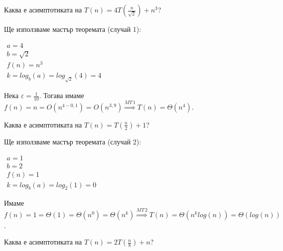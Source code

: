 \begin{problem}
	Каква е асимптотиката на $T(n)=4T(\frac n{\sqrt2})+n^3$?
\end{problem}

\begin{solution}
	Ще използваме $\hyperref[th:master-theorem]{\text{мастър теоремата}}$ (случай 1):
	\begin{center}
		$\begin{array}{|l}
			a=4\\
			b=\sqrt2\\
			f(n)=n^3\\
			k=log_b(a)=log_{\sqrt2}(4)=4
		\end{array}$
	\end{center}
	Нека $\varepsilon=\frac1{10}$. Тогава имаме $f(n)=n=O(n^{4-0,1})=O(n^{3,9})\overset{MT\,1}{\Longrightarrow}T(n)=\Theta(n^4)$.
\end{solution}\leavevmode\newline

\begin{problem}
	Каква е асимптотиката на $T(n)=T(\frac n2)+1$?
\end{problem}

\begin{solution}
	Ще използваме $\hyperref[th:master-theorem]{\text{мастър теоремата}}$ (случай 2):
	\begin{center}
		$\begin{array}{|l}
			a=1\\
			b=2\\
			f(n)=1\\
			k=log_b(a)=log_2(1)=0
		\end{array}$
	\end{center}
	Имаме $f(n)=1=\Theta(1)=\Theta(n^0)=\Theta(n^k)\overset{MT\,2}{\Longrightarrow}T(n)=\Theta(n^klog(n))=\Theta(log(n))$.
\end{solution}\leavevmode\newline

\begin{problem}
	Каква е асимптотиката на $T(n)=2T(\frac n8)+n$?
\end{problem}

